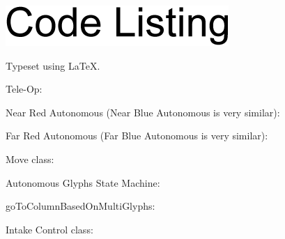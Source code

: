 \documentclass[letterpaper,10pt]{article}
\newcommand{\latex}{\LaTeX}
\begin{document}
\begin{flushleft}

\includegraphics{./CodeListingArial14.png}

\medskip

Typeset using \latex.

\medskip

\medskip

Tele-Op:



\pagebreak

Near Red Autonomous (Near Blue Autonomous is very similar):



\pagebreak

Far Red Autonomous (Far Blue Autonomous is very similar):



\pagebreak

Move class:



\pagebreak

Autonomous Glyphs State Machine:



\pagebreak

goToColumnBasedOnMultiGlyphs:



\pagebreak

Intake Control class:






\end{flushleft}
\end{document}
